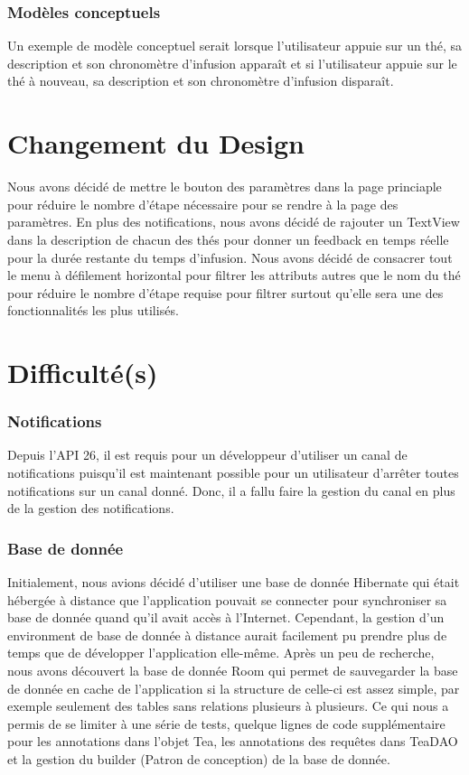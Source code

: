 \documentclass[a4paper,12pt]{article}
\begin{document}
\begin{spacing}{1}
	\subsubsection*{Modèles conceptuels}
	Un exemple de modèle conceptuel serait lorsque l'utilisateur appuie sur un thé, sa description et son chronomètre d'infusion apparaît et si l'utilisateur appuie sur le thé à nouveau, sa description et son chronomètre d'infusion disparaît.
	\section*{Changement du Design}
	Nous avons décidé de mettre le bouton des paramètres dans la page princiaple pour réduire le nombre d'étape nécessaire pour se rendre à la page des paramètres. En plus des notifications, nous avons décidé de rajouter un TextView dans la description de chacun des thés pour donner un feedback en temps réelle pour la durée restante du temps d'infusion. Nous avons décidé de consacrer tout le menu à défilement horizontal pour filtrer les attributs autres que le nom du thé pour réduire le nombre d'étape requise pour filtrer surtout qu'elle sera une des fonctionnalités les plus utilisés.
	\section*{Difficulté(s)}
	\subsubsection*{Notifications}
	Depuis l'API 26, il est requis pour un développeur d'utiliser un canal de notifications puisqu'il est maintenant possible pour un utilisateur d'arrêter toutes notifications sur un canal donné. Donc, il a fallu faire la gestion du canal en plus de la gestion des notifications.
	\subsubsection*{Base de donnée}
	Initialement, nous avions décidé d'utiliser une base de donnée Hibernate qui était hébergée à distance que l'application pouvait se connecter pour synchroniser sa base de donnée quand qu'il avait accès à l'Internet. Cependant, la gestion d'un environment de base de donnée à distance aurait facilement pu prendre plus de temps que de développer l'application elle-même. Après un peu de recherche, nous avons découvert la base de donnée Room qui permet de sauvegarder la base de donnée en cache de l'application si la structure de celle-ci est assez simple, par exemple seulement des tables sans relations plusieurs à plusieurs. Ce qui nous a permis de se limiter à une série de tests, quelque lignes de code supplémentaire pour les annotations dans l'objet Tea, les annotations des requêtes dans TeaDAO et la gestion du builder (Patron de conception) de la base de donnée.

\end{spacing}
\end{document}

